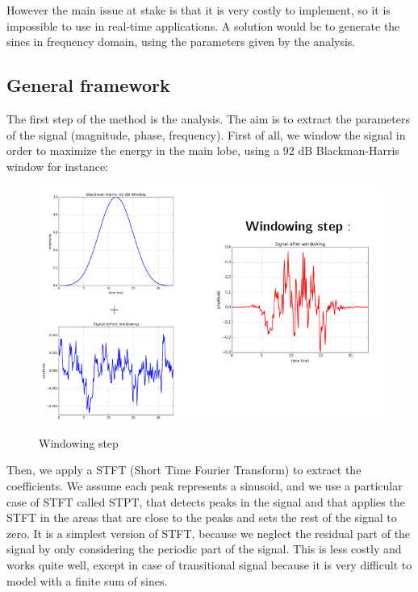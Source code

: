 \documentclass[]{article}
\begin{document}
\medskip
However the main issue at stake is that it is very costly to implement, so it is impossible to use in real-time applications. A solution would be to generate the sines in frequency domain, using the parameters given by the analysis.

\subsection{General framework}\label{sec:general-framework}

The first step of the method is the analysis. The aim is to extract the parameters of the signal (magnitude, phase, frequency).
First of all, we window the signal in order to maximize the energy in the main lobe, using a 92 dB Blackman-Harris window for instance:

\begin{figure}
	\centering
	{\includegraphics[scale=0.5]{slide1.png}}
	\caption{Windowing step}
\end{figure}

\medskip

Then, we apply a STFT (Short Time Fourier Transform) to extract the coefficients.  We assume each peak represents a sinusoid, and we use a particular case of STFT called STPT, that detects peaks in the signal and that applies the STFT in the areas that are close to the peaks and sets the rest of the signal to zero. It is a simplest version of STFT, because we neglect the residual part of the signal by only considering the periodic part of the signal. This is less costly and works quite well, except in case of transitional signal because it is very difficult to model with a finite sum of sines. 
\end{document}
